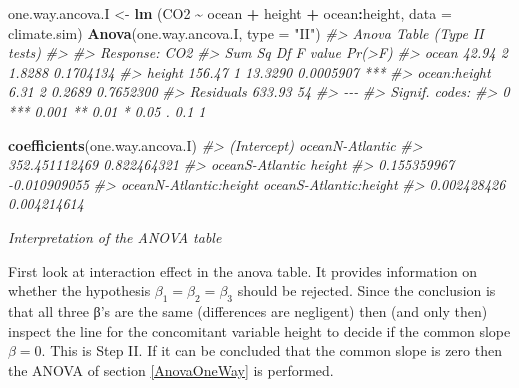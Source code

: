 \documentclass[
]{book}
\newenvironment{Shaded}{\begin{snugshade}}{\end{snugshade}}
\newcommand{\AttributeTok}[1]{\textcolor[rgb]{0.13,0.29,0.53}{#1}}
\newcommand{\CommentTok}[1]{\textcolor[rgb]{0.56,0.35,0.01}{\textit{#1}}}
\newcommand{\FunctionTok}[1]{\textcolor[rgb]{0.13,0.29,0.53}{\textbf{#1}}}
\newcommand{\NormalTok}[1]{#1}
\newcommand{\OtherTok}[1]{\textcolor[rgb]{0.56,0.35,0.01}{#1}}
\newcommand{\SpecialCharTok}[1]{\textcolor[rgb]{0.81,0.36,0.00}{\textbf{#1}}}
\newcommand{\StringTok}[1]{\textcolor[rgb]{0.31,0.60,0.02}{#1}}
\begin{document}
\begin{Shaded}
\begin{Highlighting}[]
\NormalTok{one.way.ancova.I }\OtherTok{\textless{}{-}} \FunctionTok{lm}\NormalTok{ (CO2 }\SpecialCharTok{\textasciitilde{}}\NormalTok{ ocean }\SpecialCharTok{+}\NormalTok{ height }\SpecialCharTok{+}\NormalTok{ ocean}\SpecialCharTok{:}\NormalTok{height, }
                        \AttributeTok{data =}\NormalTok{ climate.sim)}
\FunctionTok{Anova}\NormalTok{(one.way.ancova.I, }\AttributeTok{type =} \StringTok{"II"}\NormalTok{)}
\CommentTok{\#\textgreater{} Anova Table (Type II tests)}
\CommentTok{\#\textgreater{} }
\CommentTok{\#\textgreater{} Response: CO2}
\CommentTok{\#\textgreater{}              Sum Sq Df F value    Pr(\textgreater{}F)    }
\CommentTok{\#\textgreater{} ocean         42.94  2  1.8288 0.1704134    }
\CommentTok{\#\textgreater{} height       156.47  1 13.3290 0.0005907 ***}
\CommentTok{\#\textgreater{} ocean:height   6.31  2  0.2689 0.7652300    }
\CommentTok{\#\textgreater{} Residuals    633.93 54                      }
\CommentTok{\#\textgreater{} {-}{-}{-}}
\CommentTok{\#\textgreater{} Signif. codes:  }
\CommentTok{\#\textgreater{} 0 \textquotesingle{}***\textquotesingle{} 0.001 \textquotesingle{}**\textquotesingle{} 0.01 \textquotesingle{}*\textquotesingle{} 0.05 \textquotesingle{}.\textquotesingle{} 0.1 \textquotesingle{} \textquotesingle{} 1}

\FunctionTok{coefficients}\NormalTok{(one.way.ancova.I)}
\CommentTok{\#\textgreater{}            (Intercept)        oceanN{-}Atlantic }
\CommentTok{\#\textgreater{}          352.451112469            0.822464321 }
\CommentTok{\#\textgreater{}        oceanS{-}Atlantic                 height }
\CommentTok{\#\textgreater{}            0.155359967           {-}0.010909055 }
\CommentTok{\#\textgreater{} oceanN{-}Atlantic:height oceanS{-}Atlantic:height }
\CommentTok{\#\textgreater{}            0.002428426            0.004214614}
\end{Highlighting}
\end{Shaded}

\emph{Interpretation of the ANOVA table}

First look at interaction effect in the anova table. It provides information on whether the hypothesis \(\beta_1 = \beta_2 = \beta_3\) should be rejected. Since the conclusion is that all three β's are the same (differences are negligent) then (and only then) inspect the line for the concomitant variable height to decide if the common slope \(\beta = 0\). This is Step II. If it can be concluded that the common slope is zero then the ANOVA of section \ref{AnovaOneWay} is performed.
\end{document}
